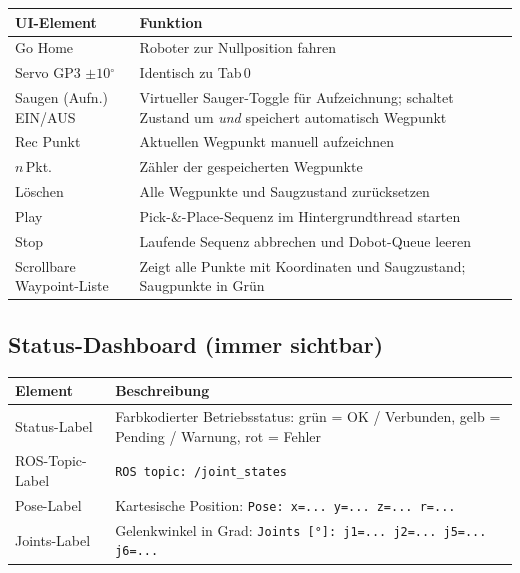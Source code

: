 \documentclass[11pt,a4paper]{article}
\begin{document}
\begin{center}
\begin{tabular}{lp{8cm}}
  \toprule
  UI-Element & Funktion \\
  \midrule
  Go Home & Roboter zur Nullposition fahren \\
  Servo GP3 $\pm 10{{}^\circ}$ & Identisch zu Tab\,0 \\
  Saugen (Aufn.) EIN/AUS & Virtueller Sauger-Toggle für Aufzeichnung;
                            schaltet Zustand um \emph{und} speichert
                            automatisch Wegpunkt \\
  Rec Punkt & Aktuellen Wegpunkt manuell aufzeichnen \\
  $n$\,Pkt. & Zähler der gespeicherten Wegpunkte \\
  Löschen & Alle Wegpunkte und Saugzustand zurücksetzen \\
  Play & Pick-\&-Place-Sequenz im Hintergrundthread starten \\
  Stop & Laufende Sequenz abbrechen und Dobot-Queue leeren \\
  Scrollbare Waypoint-Liste & Zeigt alle Punkte mit Koordinaten und
                               Saugzustand; Saugpunkte in Grün \\
  \bottomrule
\end{tabular}
\end{center}

\subsection{Status-Dashboard (immer sichtbar)}

\begin{center}
\begin{tabular}{lp{9cm}}
  \toprule
  Element & Beschreibung \\
  \midrule
  Status-Label & Farbkodierter Betriebsstatus:
                  \textcolor{green!50!black}{grün} = OK /
                  Verbunden,
                  \textcolor{orange!80!black}{gelb} = Pending /
                  Warnung,
                  \textcolor{red!70!black}{rot} = Fehler \\
  ROS-Topic-Label & \texttt{ROS topic: /joint\_states} \\
  Pose-Label & Kartesische Position:
                \texttt{Pose: x=... y=... z=... r=...} \\
  Joints-Label & Gelenkwinkel in Grad:
                  \texttt{Joints [°]: j1=... j2=... j5=... j6=...} \\
  \bottomrule
\end{tabular}
\end{center}
\end{document}
